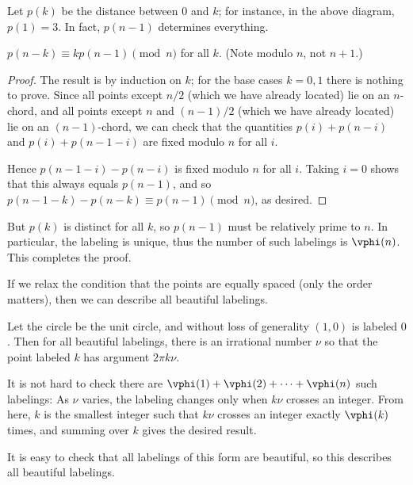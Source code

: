Let $p(k)$ be the distance between $0$ and $k$; for instance, in the above diagram, $p(1)=3$. In fact, $p(n-1)$ determines everything.
\begin{iclaim}
    $p(n-k)\equiv kp(n-1)\pmod n$ for all $k$. (Note modulo $n$, not $n+1$.)
\end{iclaim}
\begin{proof}
    The result is by induction on $k$; for the base cases $k=0,1$ there is nothing to prove. Since all points except $n/2$ (which we have already located) lie on an $n$-chord, and all points except $n$ and $(n-1)/2$ (which we have already located) lie on an $(n-1)$-chord, we can check that the quantities $p(i)+p(n-i)$ and $p(i)+p(n-1-i)$ are fixed modulo $n$ for all $i$.

    Hence $p(n-1-i)-p(n-i)$ is fixed modulo $n$ for all $i$. Taking $i=0$ shows that this always equals $p(n-1)$, and so $p(n-1-k)-p(n-k)\equiv p(n-1)\pmod n$, as desired.
\end{proof}

But $p(k)$ is distinct for all $k$, so $p(n-1)$ must be relatively prime to $n$. In particular, the labeling is unique, thus the number of such labelings is $\vphi(n)$. This completes the proof.
\begin{boxremark}
    If we relax the condition that the points are equally spaced (only the order matters), then we can describe all beautiful labelings.

    Let the circle be the unit circle, and without loss of generality $(1,0)$ is labeled $0$. Then for all beautiful labelings, there is an irrational number $\nu$ so that the point labeled $k$ has argument $2\pi k\nu$.

    It is not hard to check there are $\vphi(1)+\vphi(2)+\cdots+\vphi(n)$ such labelings: As $\nu$ varies, the labeling changes only when $k\nu$ crosses an integer. From here, $k$ is the smallest integer such that $k\nu$ crosses an integer exactly $\vphi(k)$ times, and summing over $k$ gives the desired result.

    It is easy to check that all labelings of this form are beautiful, so this describes all beautiful labelings.
\end{boxremark}

